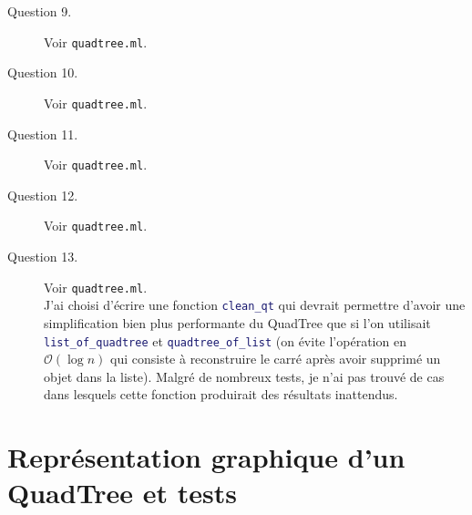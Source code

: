 \documentclass[11pt]{scrartcl}
\newcommand{\functionname}[1]{\texttt{\textcolor{MidnightBlue}{#1}}}
\newcommand{\filename}[1]{\texttt{\textcolor{RawSienna}{#1}}}
\begin{document}
\begin{description}
\item[Question 9.] Voir \filename{quadtree.ml}.

\item[Question 10.] Voir \filename{quadtree.ml}.

\item[Question 11.] Voir \filename{quadtree.ml}.

\item[Question 12.] Voir \filename{quadtree.ml}.

\item[Question 13.] Voir \filename{quadtree.ml}.\\
J'ai choisi d'écrire une fonction \functionname{clean_qt} qui devrait permettre d'avoir une simplification bien plus performante du QuadTree que si l'on utilisait \functionname{list_of_quadtree} et \functionname{quadtree_of_list} (on évite l'opération en $\mathcal{O}(\log{}n)$ qui consiste à reconstruire le carré après avoir supprimé un objet dans la liste). Malgré de nombreux tests, je n'ai pas trouvé de cas dans lesquels cette fonction produirait des résultats inattendus.
\end{description}

\section{Représentation graphique d'un QuadTree et tests}
\end{document}
